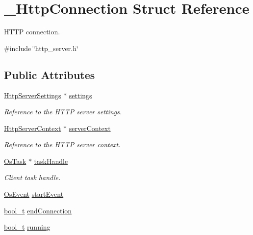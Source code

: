 \hypertarget{struct__HttpConnection}{}\section{\+\_\+\+Http\+Connection Struct Reference}
\label{struct__HttpConnection}


H\+T\+TP connection.  




{\ttfamily \#include \char`\"{}http\+\_\+server.\+h\char`\"{}}

\subsection*{Public Attributes}
\begin{DoxyCompactItemize}
\item 
\hyperlink{structHttpServerSettings}{Http\+Server\+Settings} $\ast$ \hyperlink{struct__HttpConnection_a1b59b2b74c9d694c6d8f1353f0252aa4}{settings}
\begin{DoxyCompactList}\small\item\em Reference to the H\+T\+TP server settings. \end{DoxyCompactList}\item 
\hyperlink{http__server_8h_a952abbfa31a2188c3d65357e79531e03}{Http\+Server\+Context} $\ast$ \hyperlink{struct__HttpConnection_ae6609bf946aef4d1cf4294da4ed6d30f}{server\+Context}
\begin{DoxyCompactList}\small\item\em Reference to the H\+T\+TP server context. \end{DoxyCompactList}\item 
\hyperlink{structOsTask}{Os\+Task} $\ast$ \hyperlink{struct__HttpConnection_ac671abf4639711c2737694e8b0190bda}{task\+Handle}
\begin{DoxyCompactList}\small\item\em Client task handle. \end{DoxyCompactList}\item 
\hyperlink{structOsEvent}{Os\+Event} \hyperlink{struct__HttpConnection_a4f33d2e1a3203b752e73d8ad0b018932}{start\+Event}
\item 
\hyperlink{compiler__port_8h_a812d16e5494522586b3784e55d479912}{bool\+\_\+t} \hyperlink{struct__HttpConnection_a2863626c33d19eaa662ba044e34bb888}{end\+Connection}
\item 
\hyperlink{compiler__port_8h_a812d16e5494522586b3784e55d479912}{bool\+\_\+t} \hyperlink{struct__HttpConnection_a5a7aaa19047a6dd990b6098d652af9b2}{running}

\end{DoxyCompactItemize}
